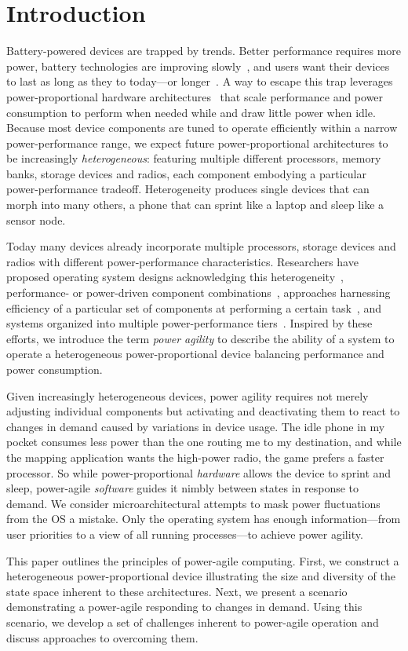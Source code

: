 \section{Introduction}

Battery-powered devices are trapped by trends. Better performance requires
more power, battery technologies are improving
slowly~\cite{economist-batteryhistory}, and users want their devices to last
as long as they to today---or longer~\cite{informationweek-batteries}. A way
to escape this trap leverages power-proportional hardware
architectures~\cite{barroso-energyproportional} that scale performance and
power consumption to perform when needed while and draw little power when
idle. Because most device components are tuned to operate efficiently within
a narrow power-performance range, we expect future power-proportional
architectures to be increasingly \textit{heterogeneous}: featuring multiple
different processors, memory banks, storage devices and radios, each
component embodying a particular power-performance tradeoff. Heterogeneity
produces single devices that can morph into many others, a phone that can
sprint like a laptop and sleep like a sensor node.

Today many devices already incorporate multiple processors, storage devices
and radios with different power-performance characteristics. Researchers have
proposed operating system designs acknowledging this
heterogeneity~\cite{baumann-barrelfish}, performance- or power-driven
component combinations~\cite{mogul-hybridnvmdram,aruna-3Gwifi}, approaches
harnessing efficiency of a particular set of components at performing a
certain task~\cite{andersen-fawn,szalay-amdahl}, and systems organized into
multiple power-performance tiers~\cite{sorber-turducken}. Inspired by these
efforts, we introduce the term \textit{power agility} to describe the ability
of a system to operate a heterogeneous power-proportional device balancing
performance and power consumption.

Given increasingly heterogeneous devices, power agility requires not merely
adjusting individual components but activating and deactivating them to react
to changes in demand caused by variations in device usage. The idle phone in
my pocket consumes less power than the one routing me to my destination, and
while the mapping application wants the high-power radio, the game prefers a
faster processor. So while power-proportional \textit{hardware} allows the
device to sprint and sleep, power-agile \textit{software} guides it nimbly
between states in response to demand. We consider microarchitectural attempts to mask power
fluctuations~\cite{rangan-hpca11} from the OS a mistake. Only the operating system has
enough information---from user priorities to a view of all running processes---to achieve power agility.

This paper outlines the principles of power-agile computing. First, we
construct a heterogeneous power-proportional device illustrating the size and
diversity of the state space inherent to these architectures. Next, we
present a scenario demonstrating a power-agile responding to changes in
demand. Using this scenario, we develop a set of challenges inherent to
power-agile operation and discuss approaches to overcoming them.
